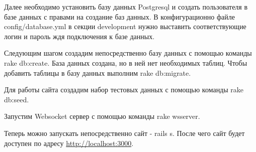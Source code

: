 Далее необходимо установить базу данных Postgresql и создать пользователя в базе
данных с правами на создание баз данных. В конфигурационно файле
config/database.yml в секции development нужно выставить соответствующие логин и
пароль ждя подключения к базе данных.

Следующим шагом создадим непосредственно базу данных с помощью команды rake
db:create. База данных создана, но в ней нет необходимых таблиц. Чтобы добавить
таблицы в базу данных выполним rake db:migrate.

Для работы сайта создадим набор тестовых данных с помощью команды rake db:seed.

Запустим Websocket сервер с помощью команды rake wsserver.

Теперь можно запускать непосредственно сайт - rails s. После чего сайт будет
доступен по адресу \url{http://localhost:3000}.